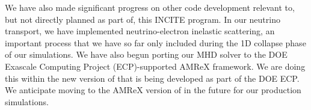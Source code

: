 \documentclass[12pt]{article}
\begin{document}




We have also made significant progress on other code development relevant to, but not directly planned as part of, this INCITE program. 
In our neutrino transport, we have implemented neutrino-electron inelastic scattering, an important process that we have so far only included during the 1D collapse phase of our simulations. 
We have also begun porting our \spark MHD solver to the DOE Exascale Computing Project (ECP)-supported AMReX framework. 
We are doing this within the new version of \flash that is being developed as part of the DOE ECP. 
We anticipate moving to the AMReX version of \flash in the future for our production simulations.


\end{document}
